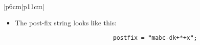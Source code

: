\begin{center}
\begin{longtable}{ |p{6cm}|p{11cm}| }
\begin{itemize}
                \item The post-fix string looks like this:
                    {
                        \begin{verbatim}
                            postfix = "mabc-dk+*+x";
                        \end{verbatim}
                    }
            \end{itemize}
        \\ 
        \hline
        \hline
        
         \\
        \hline
        \hline  
        
        

\end{longtable}
\end{center}

